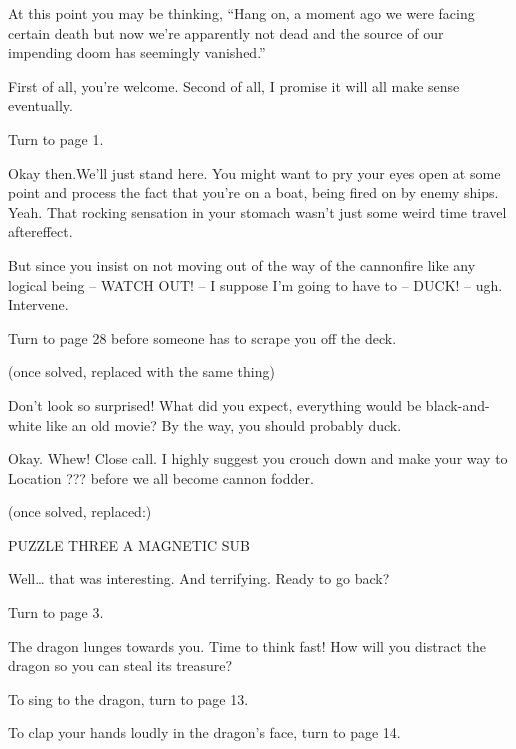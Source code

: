 \documentclass[14pt]{extbook}
\begin{document}
At this point you may be thinking, “Hang on, a moment ago we were facing certain death but now we’re apparently not dead and the source of our impending doom has seemingly vanished.”

First of all, you’re welcome. Second of all, I promise it will all make sense eventually.

Turn to page 1.
\vspace*{\fill}
\newpage

\vspace*{\fill}
Okay then.We’ll just stand here. You might want to pry your eyes open at some point and process the fact that you’re on a boat, being fired on by enemy ships. Yeah. That rocking sensation in your stomach wasn’t just some weird time travel aftereffect.

But since you insist on not moving out of the way of the cannonfire like any logical being -- WATCH OUT! -- I suppose I’m going to have to -- DUCK! -- ugh. Intervene.

Turn to page 28 before someone has to scrape you off the deck.

(once solved, replaced with the same thing)
\vspace*{\fill}
\newpage

\vspace*{\fill}
Don’t look so surprised! What did you expect, everything would be black-and-white like an old movie? By the way, you should probably duck.

Okay. Whew! Close call. I highly suggest you crouch down and make your way to Location ??? before we all become cannon fodder.

(once solved, replaced:)

PUZZLE THREE A
MAGNETIC SUB

Well… that was interesting. And terrifying. Ready to go back?

Turn to page 3.
\vspace*{\fill}
\newpage

\vspace*{\fill}
The dragon lunges towards you. Time to think fast! How will you distract the dragon so you can steal its treasure?


To sing to the dragon, turn to page 13.

To clap your hands loudly in the dragon’s face, turn to page 14.
\vspace*{\fill}
\newpage


\vspace*{\fill}
\vspace*{\fill}
\newpage
\end{document}
